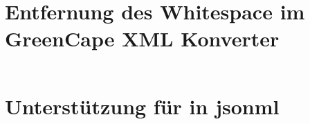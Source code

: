 \section{Entfernung des Whitespace im GreenCape XML Konverter}
\label{appx:greencapexml}

\inputminted[breakautoindent=false,fontsize=\footnotesize]{udiff}{patches/greencapexml-noindent.patch}

\newpage{}
\section{Unterstützung für  in \acrshort{jsonml}}
\label{appx:jsonmlpi}

\inputminted[breakautoindent=false,fontsize=\footnotesize]{udiff}{patches/jsonml-pi.patch}
